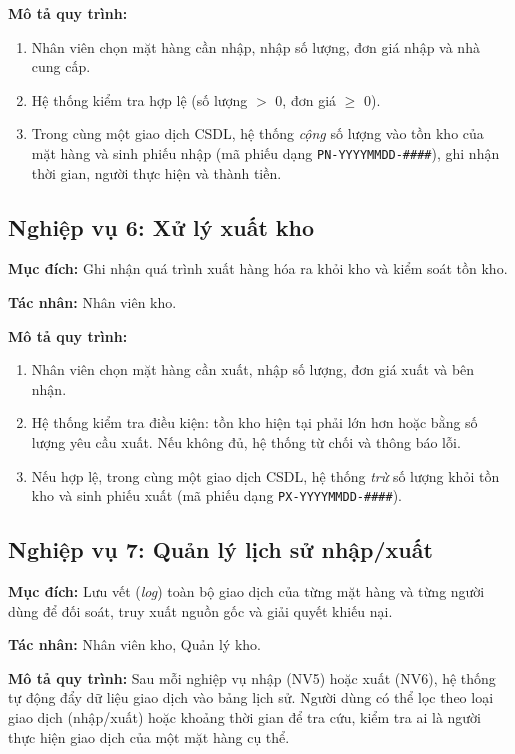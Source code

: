 \documentclass[12pt,a4paper]{report}
\begin{document}
\noindent\textbf{Mô tả quy trình:}
\begin{enumerate}[leftmargin=1.4cm]
  \item Nhân viên chọn mặt hàng cần nhập, nhập số lượng, đơn giá nhập và nhà
  cung cấp.
  \item Hệ thống kiểm tra hợp lệ (số lượng $>$ 0, đơn giá $\geq$ 0).
  \item Trong cùng một giao dịch CSDL, hệ thống \textit{cộng} số lượng vào tồn
  kho của mặt hàng và sinh phiếu nhập (mã phiếu dạng \texttt{PN-YYYYMMDD-\#\#\#\#}),
  ghi nhận thời gian, người thực hiện và thành tiền.
\end{enumerate}

\subsection{Nghiệp vụ 6: Xử lý xuất kho}
\textbf{Mục đích:} Ghi nhận quá trình xuất hàng hóa ra khỏi kho và kiểm soát
tồn kho.

\noindent\textbf{Tác nhân:} Nhân viên kho.

\noindent\textbf{Mô tả quy trình:}
\begin{enumerate}[leftmargin=1.4cm]
  \item Nhân viên chọn mặt hàng cần xuất, nhập số lượng, đơn giá xuất và bên
  nhận.
  \item Hệ thống kiểm tra điều kiện: tồn kho hiện tại phải lớn hơn hoặc bằng số
  lượng yêu cầu xuất. Nếu không đủ, hệ thống từ chối và thông báo lỗi.
  \item Nếu hợp lệ, trong cùng một giao dịch CSDL, hệ thống \textit{trừ} số
  lượng khỏi tồn kho và sinh phiếu xuất (mã phiếu dạng
  \texttt{PX-YYYYMMDD-\#\#\#\#}).
\end{enumerate}

\subsection{Nghiệp vụ 7: Quản lý lịch sử nhập/xuất}
\textbf{Mục đích:} Lưu vết (\textit{log}) toàn bộ giao dịch của từng mặt hàng và
từng người dùng để đối soát, truy xuất nguồn gốc và giải quyết khiếu nại.

\noindent\textbf{Tác nhân:} Nhân viên kho, Quản lý kho.

\noindent\textbf{Mô tả quy trình:} Sau mỗi nghiệp vụ nhập (NV5) hoặc xuất (NV6),
hệ thống tự động đẩy dữ liệu giao dịch vào bảng lịch sử. Người dùng có thể lọc
theo loại giao dịch (nhập/xuất) hoặc khoảng thời gian để tra cứu, kiểm tra ai là
người thực hiện giao dịch của một mặt hàng cụ thể.
\end{document}
